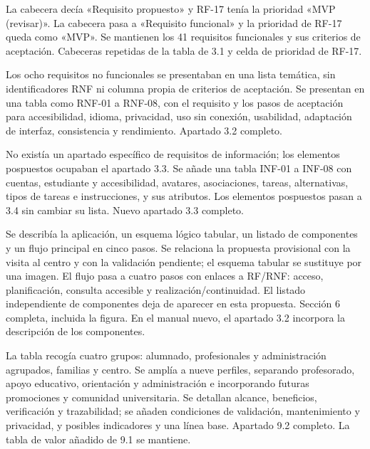 {La cabecera decía «Requisito propuesto» y RF-17 tenía la prioridad «MVP (revisar)».}
{La cabecera pasa a «Requisito funcional» y la prioridad de RF-17 queda como «MVP». Se mantienen los 41 requisitos funcionales y sus criterios de aceptación.}
{Cabeceras repetidas de la tabla de 3.1 y celda de prioridad de RF-17.}

{Los ocho requisitos no funcionales se presentaban en una lista temática, sin identificadores RNF ni columna propia de criterios de aceptación.}
{Se presentan en una tabla como RNF-01 a RNF-08, con el requisito y los pasos de aceptación para accesibilidad, idioma, privacidad, uso sin conexión, usabilidad, adaptación de interfaz, consistencia y rendimiento.}
{Apartado 3.2 completo.}

{No existía un apartado específico de requisitos de información; los elementos pospuestos ocupaban el apartado 3.3.}
{Se añade una tabla INF-01 a INF-08 con cuentas, estudiante y accesibilidad, avatares, asociaciones, tareas, alternativas, tipos de tareas e instrucciones, y sus atributos. Los elementos pospuestos pasan a 3.4 sin cambiar su lista.}
{Nuevo apartado 3.3 completo.}

{Se describía la aplicación, un esquema lógico tabular, un listado de componentes y un flujo principal en cinco pasos.}
{Se relaciona la propuesta provisional con la visita al centro y con la validación pendiente; el esquema tabular se sustituye por una imagen. El flujo pasa a cuatro pasos con enlaces a RF/RNF: acceso, planificación, consulta accesible y realización/continuidad. El listado independiente de componentes deja de aparecer en esta propuesta.}
{Sección 6 completa, incluida la figura. En el manual nuevo, el apartado 3.2 incorpora la descripción de los componentes.}

{La tabla recogía cuatro grupos: alumnado, profesionales y administración agrupados, familias y centro.}
{Se amplía a nueve perfiles, separando profesorado, apoyo educativo, orientación y administración e incorporando futuras promociones y comunidad universitaria. Se detallan alcance, beneficios, verificación y trazabilidad; se añaden condiciones de validación, mantenimiento y privacidad, y posibles indicadores y una línea base.}
{Apartado 9.2 completo. La tabla de valor añadido de 9.1 se mantiene.}

